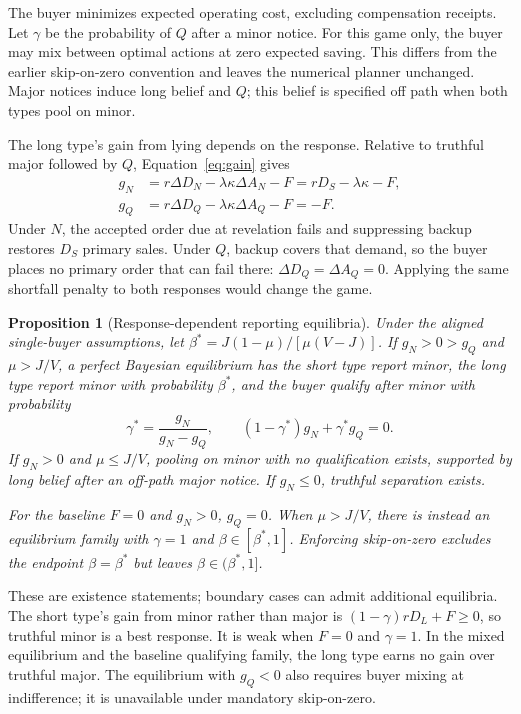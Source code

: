 \documentclass[preprint,11pt,authoryear]{elsarticle}
\newtheorem{proposition}{Proposition}
\begin{document}
The buyer minimizes expected operating cost, excluding compensation receipts. Let $\gamma$ be the probability of $Q$ after a minor notice. For this game only, the buyer may mix between optimal actions at zero expected saving. This differs from the earlier skip-on-zero convention and leaves the numerical planner unchanged. Major notices induce long belief and $Q$; this belief is specified off path when both types pool on minor.

The long type's gain from lying depends on the response. Relative to truthful major followed by $Q$, Equation~\eqref{eq:gain} gives
\begin{align}
 g_N&=r\Delta D_N-\lambda\kappa\Delta A_N-F
       =rD_S-\lambda\kappa-F,\nonumber\\
 g_Q&=r\Delta D_Q-\lambda\kappa\Delta A_Q-F=-F.\label{eq:branchgains}
\end{align}
Under $N$, the accepted order due at revelation fails and suppressing backup restores $D_S$ primary sales. Under $Q$, backup covers that demand, so the buyer places no primary order that can fail there: $\Delta D_Q=\Delta A_Q=0$. Applying the same shortfall penalty to both responses would change the game.

\begin{proposition}[Response-dependent reporting equilibria]\label{prop:equilibrium}
Under the aligned single-buyer assumptions, let
$\beta^*=J(1-\mu)/[\mu(V-J)]$.
If $g_N>0>g_Q$ and $\mu>J/V$, a perfect Bayesian equilibrium has the short type report minor, the long type report minor with probability $\beta^*$, and the buyer qualify after minor with probability
\begin{equation}
 \gamma^*=\frac{g_N}{g_N-g_Q},\qquad
 (1-\gamma^*)g_N+\gamma^*g_Q=0.\label{eq:mixing}
\end{equation}
If $g_N>0$ and $\mu\le J/V$, pooling on minor with no qualification exists, supported by long belief after an off-path major notice. If $g_N\le0$, truthful separation exists.

For the baseline $F=0$ and $g_N>0$, $g_Q=0$. When $\mu>J/V$, there is instead an equilibrium family with $\gamma=1$ and $\beta\in[\beta^*,1]$. Enforcing skip-on-zero excludes the endpoint $\beta=\beta^*$ but leaves $\beta\in(\beta^*,1]$.
\end{proposition}
These are existence statements; boundary cases can admit additional equilibria. The short type's gain from minor rather than major is $(1-\gamma)rD_L+F\ge0$, so truthful minor is a best response. It is weak when $F=0$ and $\gamma=1$. In the mixed equilibrium and the baseline qualifying family, the long type earns no gain over truthful major. The equilibrium with $g_Q<0$ also requires buyer mixing at indifference; it is unavailable under mandatory skip-on-zero.
\end{document}
